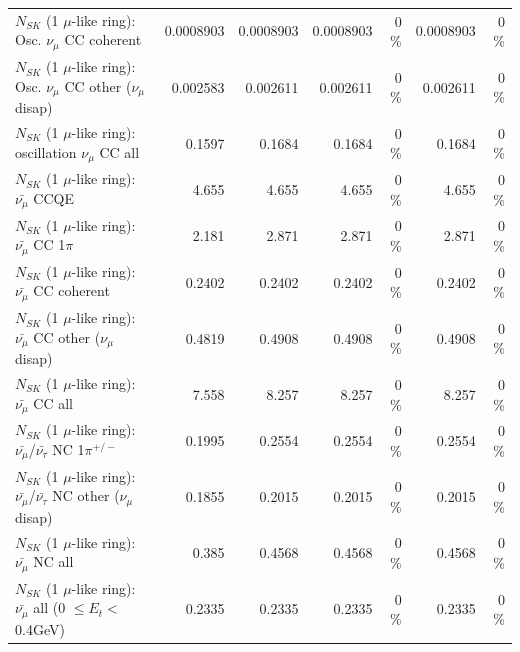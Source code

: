 \begin{table}
\begin{tabular}{| l | r | r | r  r | r  r |}
                        $N_{SK}$ (1 $\mu$-like ring): Osc. $\nu_\mu$ CC coherent &       0.0008903 &       0.0008903 &       0.0008903 &        0 \%  &       0.0008903 &        0 \%  \\ 
         $N_{SK}$ (1 $\mu$-like ring): Osc. $\nu_\mu$ CC other ($\nu_\mu$ disap) &        0.002583 &        0.002611 &        0.002611 &        0 \%  &        0.002611 &        0 \%  \\ 
                      $N_{SK}$ (1 $\mu$-like ring): oscillation $\nu_\mu$ CC all &          0.1597 &          0.1684 &          0.1684 &        0 \%  &          0.1684 &        0 \%  \\ 
\hline
\hline
                              $N_{SK}$ (1 $\mu$-like ring): $\bar{\nu_\mu}$ CCQE &           4.655 &           4.655 &           4.655 &        0 \%  &           4.655 &        0 \%  \\ 
                         $N_{SK}$ (1 $\mu$-like ring): $\bar{\nu_\mu}$ CC 1$\pi$ &           2.181 &           2.871 &           2.871 &        0 \%  &           2.871 &        0 \%  \\ 
                       $N_{SK}$ (1 $\mu$-like ring): $\bar{\nu_\mu}$ CC coherent &          0.2402 &          0.2402 &          0.2402 &        0 \%  &          0.2402 &        0 \%  \\ 
        $N_{SK}$ (1 $\mu$-like ring): $\bar{\nu_\mu}$ CC other ($\nu_\mu$ disap) &          0.4819 &          0.4908 &          0.4908 &        0 \%  &          0.4908 &        0 \%  \\ 
                          $N_{SK}$ (1 $\mu$-like ring): $\bar{\nu_{\mu}}$ CC all &           7.558 &           8.257 &           8.257 &        0 \%  &           8.257 &        0 \%  \\ 
\hline
  $N_{SK}$ (1 $\mu$-like ring): $\bar{\nu_\mu}$/$\bar{\nu_\tau}$ NC 1$\pi^{+/-}$ &          0.1995 &          0.2554 &          0.2554 &        0 \%  &          0.2554 &        0 \%  \\ 
$N_{SK}$ (1 $\mu$-like ring): $\bar{\nu_\mu}$/$\bar{\nu_\tau}$ NC other ($\nu_\mu$ disap) &          0.1855 &          0.2015 &          0.2015 &        0 \%  &          0.2015 &        0 \%  \\ 
                          $N_{SK}$ (1 $\mu$-like ring): $\bar{\nu_{\mu}}$ NC all &           0.385 &          0.4568 &          0.4568 &        0 \%  &          0.4568 &        0 \%  \\ 
\hline
   $N_{SK}$ (1 $\mu$-like ring): $\bar{\nu_{\mu}}$ all (0 $\leq E_{t} <$ 0.4GeV) &          0.2335 &          0.2335 &          0.2335 &        0 \%  &          0.2335 &        0 \%  \\ 

\end{tabular}
\end{table}

